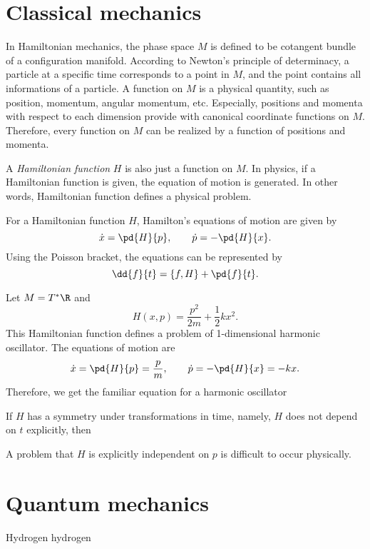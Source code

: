 \documentclass[11pt]{article}
\begin{document}
\maketitle
\tableofcontents


\section{Classical mechanics}

In Hamiltonian mechanics, the phase space $M$ is defined to be cotangent bundle of a configuration manifold.
According to Newton's principle of determinacy, a particle at a specific time corresponds to a point in $M$, and the point contains all informations of a particle.
A function on $M$ is a physical quantity, such as position, momentum, angular momentum, etc.
Especially, positions and momenta with respect to each dimension provide with canonical coordinate functions on $M$.
Therefore, every function on $M$ can be realized by a function of positions and momenta.

A \emph{Hamiltonian function} $H$ is also just a function on $M$.
In physics, if a Hamiltonian function is given, the equation of motion is generated.
In other words, Hamiltonian function defines a physical problem.

\begin{defn}
For a Hamiltonian function $H$, Hamilton's equations of motion are given by
\[\dot x=\pd{H}{p},\qquad\dot p=-\pd{H}{x}.\]
Using the Poisson bracket, the equations can be represented by
\[\dd{f}{t} = \{f,H\} + \pd{f}{t}.\]
\end{defn}

\begin{ex}
Let $M=T^*\R$ and
\[H(x,p)=\frac{p^2}{2m}+\frac12kx^2.\]
This Hamiltonian function defines a problem of 1-dimensional harmonic oscillator.
The equations of motion are
\[\dot x=\pd{H}{p}=\frac pm,\qquad\dot p=-\pd{H}{x}=-kx.\]
Therefore, we get the familiar equation for a harmonic oscillator
\end{ex}



If $H$ has a symmetry under transformations in time, namely, $H$ does not depend on $t$ explicitly, then 

A problem that $H$ is explicitly independent on $p$ is difficult to occur physically.


\section{Quantum mechanics}
\begin{prb}
Hydrogen
\q hydrogen
\end{prb}
\end{document}
